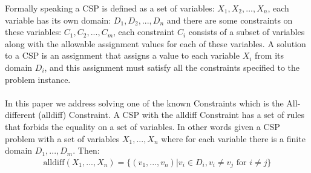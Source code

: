 Formally speaking a CSP is defined as a set of variables: $X_{1}, X_{2},...,X_{n}$, each variable has its own domain: $D_{1}, D_{2},...,D_{n}$ and there are some constraints on these variables: $C_{1}, C_{2},...,C_{m}$, each constraint $C_{i}$ consists of a subset of variables along with the allowable assignment values for each of these variables. A solution to a CSP is an assignment that assigns a value to each variable $X_{i}$ from its domain $D_{i}$, and this assignment must satisfy all the constraints specified to the problem instance.
\\
\\
In this paper we address solving one of the known Constraints which is the All-different (alldiff) Constraint. A CSP with the alldiff Constraint has a set of rules that forbids the equality on a set of variables. In other words given a CSP problem with a set of variables $X_{1},...,X_{n}$  where for each variable there is a finite domain $D_{1},...,D_{m}$. Then:
\begin{eqnarray*}
  \textrm{alldiff}(X_{1},...,X_{n}) = \{(v_{1},...,v_{n}) | v_{i} \in D_{i}, v_{i} \neq v_{j} \textrm{ for } i \neq j\}
\end{eqnarray*}
\\
\\

